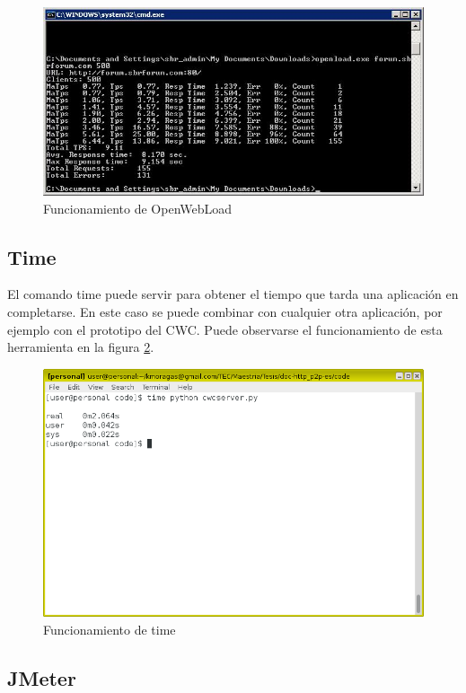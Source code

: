 \begin{figure}[h]
  \centering
    \includegraphics[scale=0.6]{gfx/OpenWebLoad}
  \caption{Funcionamiento de OpenWebLoad}
  \label{OpenWebLoad}
\end{figure}

\subsection{Time}
El comando time puede servir para obtener el tiempo que tarda una aplicación en completarse. En este caso se puede combinar con cualquier otra aplicación, por ejemplo con el prototipo del CWC. Puede observarse el funcionamiento de esta herramienta en la figura \ref{time}.

\begin{figure}[h]
  \centering
    \includegraphics[scale=0.6]{gfx/time}
  \caption{Funcionamiento de time}
  \label{time}
\end{figure}


\subsection{JMeter}

